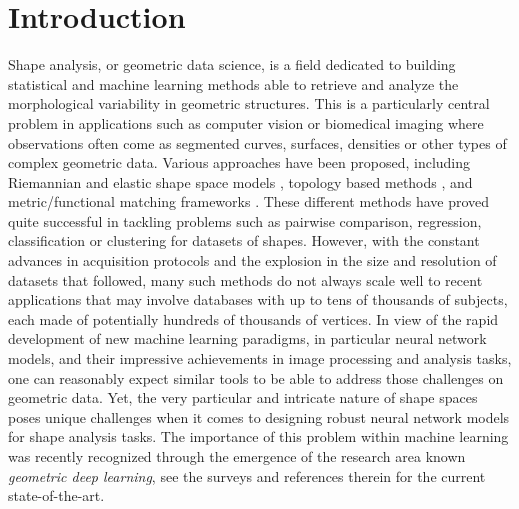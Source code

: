 \documentclass[11pt]{article}
\begin{document}
\section{Introduction}
Shape analysis, or geometric data science, is a field dedicated to building statistical and machine learning methods able to retrieve and analyze the morphological variability in geometric structures. This is a particularly central problem in applications such as computer vision or biomedical imaging where observations often come as segmented curves, surfaces, densities or other types of complex geometric data. Various approaches have been proposed, including Riemannian and elastic shape space models \cite{grenander1996elements,michor2007overview,jermyn2012elastic,younes2019shapes}, topology based methods \cite{ghrist2008barcodes,carlsson2009topology,edelsbrunner2017persistent}, and metric/functional matching frameworks \cite{bronstein2006generalized,memoli2011gromov,ovsjanikov2012functional}. These different methods have proved quite successful in tackling problems such as pairwise comparison, regression, classification or clustering for datasets of shapes. However, with the constant advances in acquisition protocols and the explosion in the size and resolution of datasets that followed, many such methods do not always scale well to recent applications that may involve databases with up to tens of thousands of subjects, each made of potentially hundreds of thousands of vertices. In view of the rapid development of new machine learning paradigms, in particular neural network models, and their impressive achievements in image processing and analysis tasks, one can reasonably expect similar tools to be able to address those challenges on geometric data. Yet, the very particular and intricate nature of shape spaces poses unique challenges when it comes to designing robust neural network models for shape analysis tasks. The importance of this problem within machine learning was recently recognized through the emergence of the research area known \textit{geometric deep learning}, see the surveys \cite{bronstein2017geometric,cao2020comprehensive,gerken2023geometric} and references therein for the current state-of-the-art.    
\end{document}
